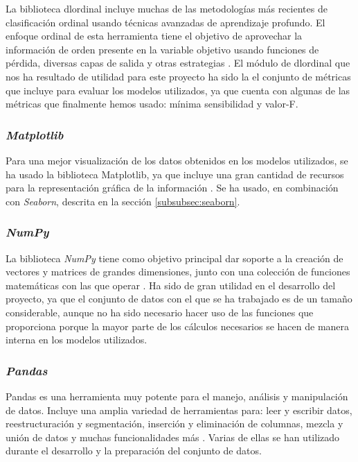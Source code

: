 La biblioteca dlordinal incluye muchas de las metodologías más recientes de clasificación ordinal usando técnicas avanzadas de aprendizaje profundo. El enfoque ordinal de esta herramienta tiene el objetivo de aprovechar la información de orden presente en la variable objetivo usando funciones de pérdida, diversas capas de salida y otras estrategias \cite{dlordinal}. El módulo de dlordinal que nos ha resultado de utilidad para este proyecto ha sido la el conjunto de métricas que incluye para evaluar los modelos utilizados, ya que cuenta con algunas de las métricas que finalmente hemos usado: mínima sensibilidad y valor-F.

\subsubsection{\textit{Matplotlib}}
\label{subsubsec:matplotlib}

Para una mejor visualización de los datos obtenidos en los modelos utilizados, se ha usado la biblioteca Matplotlib, ya que incluye una gran cantidad de recursos para la representación gráfica de la información \cite{matplotlib}. Se ha usado, en combinación con \textit{Seaborn}, descrita en la sección \ref{subsubsec:seaborn}.

\subsubsection{\textit{NumPy}}
\label{subsubsec:numpy}

La biblioteca \textit{NumPy} tiene como objetivo principal dar soporte a la creación de vectores y matrices de grandes dimensiones, junto con una colección de funciones matemáticas con las que operar \cite{numpy}. Ha sido de gran utilidad en el desarrollo del proyecto, ya que el conjunto de datos con el que se ha trabajado es de un tamaño considerable, aunque no ha sido necesario hacer uso de las funciones que proporciona porque la mayor parte de los cálculos necesarios se hacen de manera interna en los modelos utilizados.

\subsubsection{\textit{Pandas}}
\label{subsubsec:pandas}

Pandas es una herramienta muy potente para el manejo, análisis y manipulación de datos. Incluye una amplia variedad de herramientas para: leer y escribir datos, reestructuración y segmentación, inserción y eliminación de columnas, mezcla y unión de datos y muchas funcionalidades más \cite{pandas}. Varias de ellas se han utilizado durante el desarrollo y la preparación del conjunto de datos.

